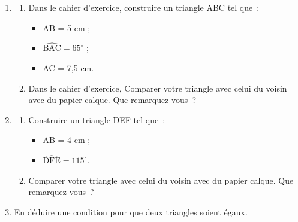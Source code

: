 \documentclass[activite]{thedocument}
\begin{document}
\begin{enumerate}
    \item \begin{enumerate}\item Dans le cahier d'exercice, construire un triangle
    ABC tel que~:
    \begin{itemize}
        \item AB = 5 cm ;
        \item $\widehat{\text{BAC}}=65^\circ$ ;
        \item AC = 7,5 cm.
    \end{itemize}
    \item Dans le cahier d'exercice, Comparer votre triangle avec celui du voisin
    avec du papier calque. Que remarquez-vous~?
    \answerspace{5em}
    \end{enumerate}
    \item \begin{enumerate}\item Construire un triangle DEF tel que~:
        \begin{itemize}
            \item AB = 4 cm ;
            \item $\widehat{\text{DFE}}=115^\circ$.
        \end{itemize}
        \item Comparer votre triangle avec celui du voisin avec du papier calque.
        Que remarquez-vous~?
        \answerspace{5em}
    \end{enumerate}
    \item En déduire une condition pour que deux triangles soient égaux.
    \answerspace{10em}
\end{enumerate}
\end{document}
